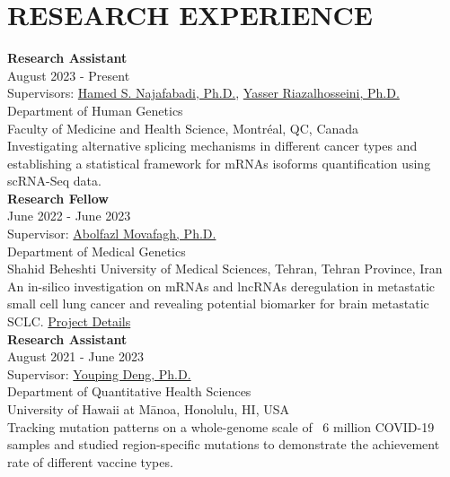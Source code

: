 \documentclass[a4paper,9pt]{extarticle}
\begin{document}
\section*{RESEARCH EXPERIENCE}
\noindent
\newline
\textbf{Research Assistant} \\
August 2023 - Present \\
Supervisors: \href{https://scholar.google.com/citations?user=7RluIhUAAAAJ&hl=en}{Hamed S. Najafabadi, Ph.D.},  \href{https://scholar.google.com/citations?user=nTabYNcAAAAJ}{Yasser Riazalhosseini, Ph.D.}\\
Department of Human Genetics \\
Faculty of Medicine and Health Science, Montréal, QC, Canada \\ 
Investigating alternative splicing mechanisms in different cancer types and establishing a statistical framework for mRNAs isoforms quantification using scRNA-Seq data. \\ 


\noindent
\textbf{Research Fellow} \\
June 2022 - June 2023 \\
Supervisor: \href{https://scholar.google.com/citations?user=o2NAtDIAAAAJ&hl=en}{Abolfazl Movafagh, Ph.D.}\\
Department of Medical Genetics \\
Shahid Beheshti University of Medical Sciences, Tehran, Tehran Province, Iran \\ 
An in-silico investigation on mRNAs and lncRNAs deregulation in metastatic small cell lung cancer and revealing potential biomarker for brain metastatic SCLC. \href{https://drive.google.com/file/d/1HORJcyF-bwOsYw6FeWyZysfa3_7bd7uB/view}{Project Details} \\ 



\noindent
\textbf{Research Assistant} \\
August 2021 - June 2023  \\
Supervisor: \href{https://scholar.google.com/citations?hl=en&user=TA6BGwcAAAAJ}{Youping Deng, Ph.D.} \\
Department of Quantitative Health Sciences \\
University of Hawaii at Mānoa, Honolulu, HI, USA \\ 
Tracking mutation patterns on a whole-genome scale of ~6 million COVID-19 samples and studied region-specific mutations to demonstrate the achievement rate of different vaccine types. \\
\end{document}
